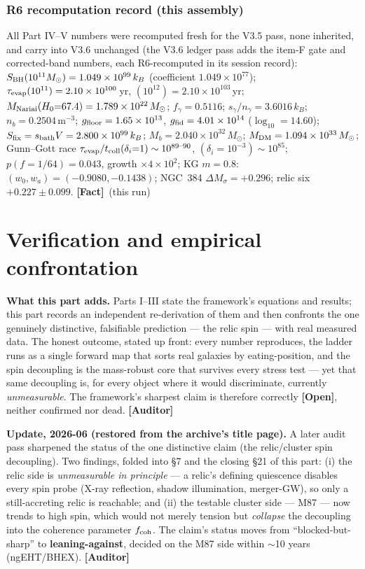 \documentclass[11pt]{article}
\newcommand{\Fact}{\textbf{\textcolor{green!45!black}{[Fact]}}}
\newcommand{\Open}{\textbf{\textcolor{gray!10!black}{[Open]}}}
\newcommand{\Auditor}{\textbf{\textcolor{teal!55!black}{[Auditor]}}}
\begin{document}
\section{R6 recomputation record (this assembly)}
All Part IV--V numbers were recomputed fresh for the V3.5 pass, none inherited, and carry into V3.6 unchanged (the V3.6 ledger pass adds the item-F gate and corrected-band numbers, each R6-recomputed in its session record): $S_{\rm BH}(10^{11}M_\odot)=1.049\times10^{99}\,k_B$ (coefficient $1.049\times10^{77}$); $\tau_{\rm evap}(10^{11})=2.10\times10^{100}$\,yr, $(10^{12})=2.10\times10^{103}$\,yr; $M_{\rm Nariai}(H_0{=}67.4)=1.789\times10^{22}\,M_\odot$; $f_\gamma=0.5116$; $s_\gamma/n_\gamma=3.6016\,k_B$; $n_b=0.2504$\,m$^{-3}$; $g_{\rm floor}=1.65\times10^{13}$, $g_{\rm fid}=4.01\times10^{14}$ ($\log_{10}=14.60$); $S_{\rm fix}=s_{\rm bath}V=2.800\times10^{99}\,k_B$; $M_b=2.040\times10^{32}\,M_\odot$; $M_{\rm DM}=1.094\times10^{33}\,M_\odot$; Gunn--Gott race $\tau_{\rm evap}/t_{\rm coll}(\delta_i{=}1)\sim10^{89\text{--}90}$, $(\delta_i{=}10^{-3})\sim10^{85}$; $p(f{=}1/64)=0.043$, growth $\times4\times10^{2}$; KG $m{=}0.8$: $(w_0,w_a)=(-0.9080,-0.1438)$; NGC~384 $\Delta M_\sigma=+0.296$; relic six $+0.227\pm0.099$. \Fact\ (this run)

\clearpage

\part{Verification and empirical confrontation}
\setcounter{section}{0}\setcounter{equation}{0}\setcounter{figure}{0}

\noindent\textbf{What this part adds.} Parts I--III state the framework's equations and results; this part records an independent re-derivation of them and then confronts the one genuinely distinctive, falsifiable prediction --- the relic spin --- with real measured data. The honest outcome, stated up front: every number reproduces, the ladder runs as a single forward map that sorts real galaxies by eating-position, and the spin decoupling is the mass-robust core that survives every stress test --- yet that same decoupling is, for every object where it would discriminate, currently \emph{unmeasurable}. The framework's sharpest claim is therefore correctly \Open, neither confirmed nor dead. \Auditor

\noindent\textbf{Update, 2026-06 (restored from the archive's title page).} A later audit pass sharpened the status of the one distinctive claim (the relic/cluster spin decoupling). Two findings, folded into \S7 and the closing \S21 of this part: (i) the relic side is \emph{unmeasurable in principle} --- a relic's defining quiescence disables every spin probe (X-ray reflection, shadow illumination, merger-GW), so only a still-accreting relic is reachable; and (ii) the testable cluster side --- M87 --- now trends to high spin, which would not merely tension but \emph{collapse} the decoupling into the coherence parameter $f_{\rm coh}$. The claim's status moves from ``blocked-but-sharp'' to \textbf{leaning-against}, decided on the M87 side within $\sim$10 years (ngEHT/BHEX). \Auditor
\end{document}
